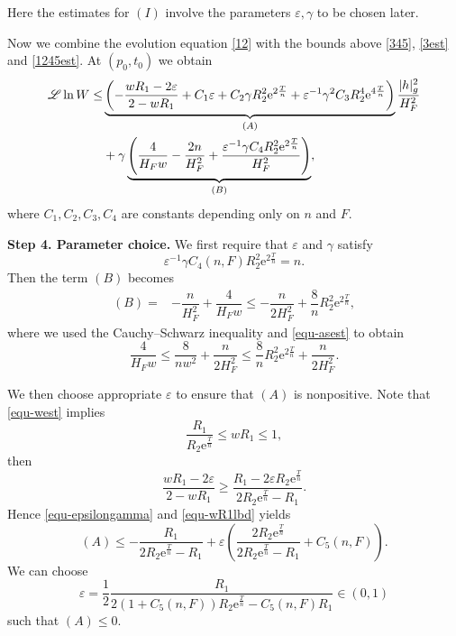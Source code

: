 \documentclass[11pt,reqno]{amsart}
\theoremstyle{definition}
\theoremstyle{remark}
\numberwithin{equation}{section}
\begin{document}
		Here the estimates for $(I)$ involve the parameters $\varepsilon,\gamma$ to be chosen later.
		
		Now we combine the evolution equation \eqref{12} with the bounds above \eqref{345}, \eqref{3est} and \eqref{1245est}. At $(p_0,t_0)$ we obtain
		\begin{align}
			\mathscr{L} \ln W \leq& \underbrace{ \left(-\dfrac{wR_1-2\varepsilon}{2-wR_1} + C_1\varepsilon + C_2\gamma R_2^2 \mathrm{e}^{2\frac{T}{n}} + \varepsilon^{-1}\gamma^2 C_3R_2^4\mathrm{e}^{4\frac{T}{n}} \right)}_{(A)}\dfrac{|h|_{g}^2}{H_F^2} \notag\\
			&+\gamma\underbrace{\left( \dfrac{4}{H_F w}-\dfrac{2n}{H_F^2} + \dfrac{\varepsilon^{-1}\gamma C_4R_2^2\mathrm{e}^{2\frac{T}{n}}}{H_F^2} \right)}_{(B)}, \label{equ-lnww}
		\end{align}
		where $C_1,C_2,C_3,C_4$ are constants depending only on $n$ and $F$.
		
		\textbf{Step 4. Parameter choice.}
		We first require that $\varepsilon$ and $\gamma$ satisfy
		\begin{equation}
			\varepsilon^{-1}\gamma C_4(n,F)R_2^2\mathrm{e}^{2\frac{T}{n}}=n.
			\label{equ-epsilongamma}
		\end{equation}
		Then the term $(B)$ becomes
		\begin{align*}
			(B) =& - \dfrac{n}{H_F^2} + \dfrac{4}{H_F w} 
			\leq  -\dfrac{n}{2H_F^2} + \dfrac{8}{n}R_2^2\mathrm{e}^{2\frac{T}{n}}, %
		\end{align*}
		where we used the Cauchy--Schwarz inequality and \eqref{equ-asest} to obtain
		\begin{equation*}
			\dfrac{4}{H_F w} \leq \dfrac{8}{nw^2} + \dfrac{n}{2H_F^2} \leq \dfrac{8}{n}R_2^2\mathrm{e}^{2\frac{T}{n}} + \dfrac{n}{2H_F^2}.
		\end{equation*}
		
		We then choose appropriate $\varepsilon$ to ensure that $(A)$ is nonpositive. Note that \eqref{equ-west} implies
		\begin{equation*}
			\dfrac{R_1}{R_2\mathrm{e}^{\frac{T}{n}}}\leq wR_1 \leq 1,
		\end{equation*}
		then
		\begin{equation}
			\dfrac{wR_1-2\varepsilon}{2-wR_1}\geq \dfrac{R_1-2\varepsilon R_2\mathrm{e}^{\frac{T}{n}}}{2R_2\mathrm{e}^{\frac{T}{n}} - R_1}.
			\label{equ-wR1lbd}
		\end{equation}
		Hence \eqref{equ-epsilongamma} and \eqref{equ-wR1lbd} yields
		\begin{equation*}
			(A) \leq -\dfrac{R_1}{2R_2\mathrm{e}^{\frac{T}{n}} - R_1} + \varepsilon \left( \dfrac{2R_2\mathrm{e}^{\frac{T}{n}}}{2R_2\mathrm{e}^{\frac{T}{n}}-R_1}+C_5(n,F) \right).
		\end{equation*}
		We can choose
		\begin{equation}
			\varepsilon=\dfrac{1}{2}\dfrac{R_1}{2(1+C_5(n,F))R_2\mathrm{e}^{\frac{T}{n}}-C_5(n,F)R_1}\in (0,1)  \label{equ-epsilon}
		\end{equation}
		such that $(A)\leq 0$.
	
\end{document}
